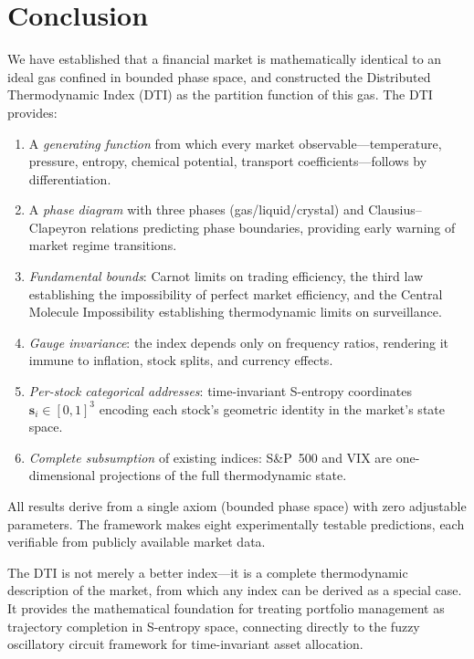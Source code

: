 \documentclass[twocolumn,10pt]{article}
\theoremstyle{remark}
\begin{document}
\section{Conclusion}
\label{sec:conclusion}

We have established that a financial market is mathematically identical to an ideal gas confined in bounded phase space, and constructed the Distributed Thermodynamic Index (DTI) as the partition function of this gas.  The DTI provides:

\begin{enumerate}[label=\arabic*.]
    \item A \emph{generating function} from which every market observable---temperature, pressure, entropy, chemical potential, transport coefficients---follows by differentiation.

    \item A \emph{phase diagram} with three phases (gas/liquid/crystal) and Clausius--Clapeyron relations predicting phase boundaries, providing early warning of market regime transitions.

    \item \emph{Fundamental bounds}: Carnot limits on trading efficiency, the third law establishing the impossibility of perfect market efficiency, and the Central Molecule Impossibility establishing thermodynamic limits on surveillance.

    \item \emph{Gauge invariance}: the index depends only on frequency ratios, rendering it immune to inflation, stock splits, and currency effects.

    \item \emph{Per-stock categorical addresses}: time-invariant S-entropy coordinates $\mathbf{s}_i \in [0,1]^3$ encoding each stock's geometric identity in the market's state space.

    \item \emph{Complete subsumption} of existing indices: S\&P~500 and VIX are one-dimensional projections of the full thermodynamic state.
\end{enumerate}

All results derive from a single axiom (bounded phase space) with zero adjustable parameters.  The framework makes eight experimentally testable predictions, each verifiable from publicly available market data.

The DTI is not merely a better index---it is a complete thermodynamic description of the market, from which any index can be derived as a special case.  It provides the mathematical foundation for treating portfolio management as trajectory completion in S-entropy space, connecting directly to the fuzzy oscillatory circuit framework for time-invariant asset allocation.



\end{document}
